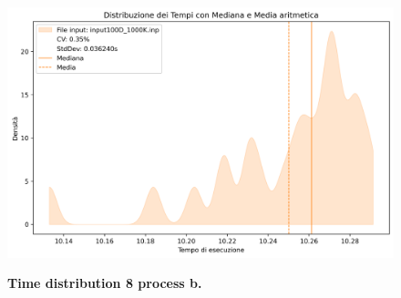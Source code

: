 \documentclass{article}
\begin{document}
\begin{figure}[ht]
\begin{minipage}{0.45\textwidth}
      \label{time_d_8_small}
    \end{minipage}
    \begin{minipage}{0.45\textwidth}
      \centering
      \caption{\textbf{Time distribution 8 process b.}}
      \includegraphics[width=\linewidth]{../test_csv/plots/time_distribution/time_distribution_100D_1000K_omp_mpi_8.png}
      \label{time_d_8_big}
    \end{minipage}
  \end{figure}
\end{document}
